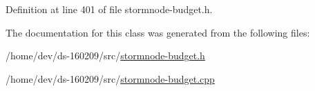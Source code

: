 Definition at line 401 of file stormnode-\/budget.\+h.



The documentation for this class was generated from the following files\+:\begin{DoxyCompactItemize}
\item 
/home/dev/ds-\/160209/src/\hyperlink{stormnode-budget_8h}{stormnode-\/budget.\+h}\item 
/home/dev/ds-\/160209/src/\hyperlink{stormnode-budget_8cpp}{stormnode-\/budget.\+cpp}\end{DoxyCompactItemize}
